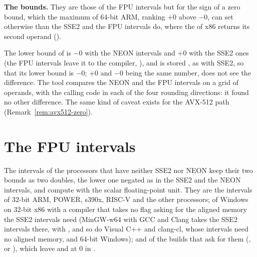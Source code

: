 \documentclass[12pt,a4paper,twoside,openright]{book}
\begin{document}
\medskip
\noindent
\textbf{The bounds.} They are those of the FPU intervals but for the sign of
a zero bound, which the maximum of 64-bit ARM, ranking $+0$ above $-0$, can
set otherwise than the SSE2 and the FPU intervals do, where the 
of x86 returns its second operand ().

\begin{Rem}\label{rem:neon-zero}
The lower bound of \code{[-1, 0] * [-1, 0]} is $-0$ with the NEON intervals
and $+0$ with the SSE2 ones (the FPU intervals leave it to the compiler,
), and  is stored
, as with SSE2, so that its lower bound is $-0$; $+0$ and
$-0$ being the same number, \code{==} does not see the difference. The tool
 compares the NEON and the FPU intervals on a grid of
operands, with the calling code in each of the four rounding directions: it
found no other difference. The same kind of caveat exists for the AVX-512
path (Remark~\ref{rem:avx512-zero}).
\end{Rem}

\section{The FPU intervals}\label{sec:fpu-intervals}
%

The intervals of the processors that have neither SSE2 nor NEON keep their
two bounds as two doubles, the lower one negated as in the SSE2 and the NEON
intervals, and compute with the scalar floating-point unit. They are the
intervals of 32-bit ARM, POWER, s390x, RISC-V and the other processors; of
Windows on 32-bit x86 with a compiler that takes no flag asking for the
aligned memory the SSE2 intervals need (MinGW-w64 with GCC and Clang takes
the SSE2 intervals there, with , and so do Visual C++
and clang-cl, whose intervals need no aligned memory, and 64-bit Windows);
and of the builds that ask for them (,
 or ), which leave
 and
 at 0 in
.
\end{document}
